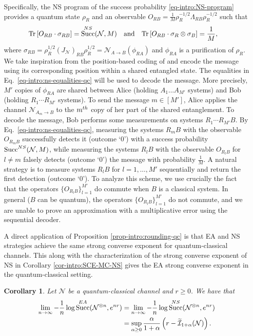\documentclass[a4paper,onecolumn,11pt,accepted=2025-10-01]{quantumarticle}
\newtheorem{cor}[theorem]{Corollary}
\DeclareMathOperator{\suc}{Succ}
\newcommand*{\cI}{\mathcal{I}}
\newcommand*{\cN}{\mathcal{N}}
\newcommand*{\tr}[1]{\mathrm{Tr}\left[#1\right]}
\begin{document}
Specifically, the NS program of the success probability \eqref{eq-intro:NS-program} provides a quantum state $\rho_R$ and an observable $O_{RB} = \frac{1}{M} \rho_R^{-1/2} \Lambda_{RB}\rho_R^{-1/2}$ such that 
\begin{align}\label{eq-intro:ns-equalities-qc}
      \tr{O_{RB} \cdot \sigma_{RB}} &= \suc^{\rm{NS}}(\cN,M)   \quad \text{and} \quad \tr{O_{RB} \cdot \sigma_R \otimes \sigma_B} = \frac{1}{M},
\end{align}
where $\sigma_{RB} = \rho_R^{1/2} (J_{\cN})_{RB}\rho_R^{1/2} = \cN_{A\rightarrow B}(\phi_{RA})$ and $\phi_{RA}$ is a purification of $\rho_R$.  We take inspiration from the position-based coding of \cite{Anshu2018Jun} and encode the message  using its corresponding position within a shared entangled state. The equalities in Eq.~\eqref{eq-intro:ns-equalities-qc} will be used to decode the message. More precisely, 
$M'$ copies of $\phi_{RA}$ are shared between Alice (holding $A_1\dots A_{M'}$ systems) and Bob (holding $R_1\cdots R_{M'}$ systems). To send the message $m\in [M']$, Alice applies the channel $\cN_{A_m \rightarrow B}$ to the $m^{\rm{th}}$ copy of her part of the shared entanglement. To decode the message, Bob performs some measurements on systems $R_1\cdots R_{M'} B$. By Eq.~\eqref{eq-intro:ns-equalities-qc}, measuring the systems $R_mB$ with the observable $O_{R_mB}$ successfully detects it (outcome ‘$0$') with a success probability $\suc^{\rm{NS}}(\cN,M)$, while measuring the systems $R_lB$ with the observable $O_{R_lB}$ for $l\neq m$  falsely detects (outcome ‘$0$') the message with probability $\frac{1}{M}$. A natural strategy is to measure systems  $R_lB$ for $l=1, \dots ,M'$ sequentially and return the first detection (outcome ‘$0$'). To analyze this scheme, we use crucially the fact that the operators $\{O_{R_lB}\}_{l=1}^{M'}$ do commute when $B$ is a classical system. In general ($B$ can be quantum), the operators $\{O_{R_lB}\}_{l=1}^{M'}$ do not commute, and we are unable to prove an approximation with a multiplicative error using the sequential decoder.

A direct application of Proposition \ref{prop-intro:rounding-qc} is that EA and NS strategies achieve the same strong converse exponent for quantum-classical channels. This along with the characterization of the strong converse exponent of NS in Corollary \ref{cor-intro:SCE-MC-NS} gives the EA strong converse exponent in the quantum-classical setting.

\begin{cor}\label{cor-intro:QC-EA-exponent}
 Let $\cN$ be a  quantum-classical channel and $r\ge 0$. We have that
    \begin{align}\label{intro:QC-EA-exponent}
        \lim_{n\rightarrow \infty} -\frac{1}{n}\log\suc^{\rm{EA}}(\cN^{\otimes n},e^{nr}) 
        &=  \lim_{n\rightarrow \infty} -\frac{1}{n}\log\suc^{\rm{NS}}(\cN^{\otimes n},e^{nr})
        \\&= \sup_{\alpha\ge 0}  \frac{\alpha}{1+\alpha}\left( r- \widetilde{\cI}_{1+\alpha}(\cN)\right).
    \end{align}
\end{cor}
\end{document}
